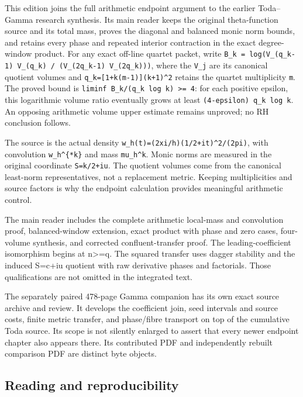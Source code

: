 \documentclass[
]{article}
\begin{document}
This edition joins the full arithmetic endpoint argument to the earlier
Toda--Gamma research synthesis. Its main reader keeps the original
theta-function source and its total mass, proves the diagonal and
balanced monic norm bounds, and retains every phase and repeated
interior contraction in the exact degree-window product. For any exact
off-line quartet packet, write
\texttt{B\_k\ =\ log(V\_(q\_k-1)\ V\_(q\_k)\ /\ (V\_(2q\_k-1)\ V\_(2q\_k)))},
where the \texttt{V\_j} are its canonical quotient volumes and
\texttt{q\_k={[}1+k(m-1){]}(k+1)\^{}2} retains the quartet multiplicity
\texttt{m}. The proved bound is
\texttt{liminf\ B\_k/(q\_k\ log\ k)\ \textgreater{}=\ 4}: for each
positive epsilon, this logarithmic volume ratio eventually grows at
least \texttt{(4-epsilon)\ q\_k\ log\ k}. An opposing arithmetic volume
upper estimate remains unproved; no RH conclusion follows.

The source is the actual density
\texttt{w\_h(t)=\textbar{}(2xi/h)(1/2+it)\textbar{}\^{}2/(2pi)}, with
convolution \texttt{w\_h\^{}\{*k\}} and mass \texttt{mu\_h\^{}k}. Monic
norms are measured in the original coordinate \texttt{S=k/2+iu}. The
quotient volumes come from the canonical least-norm representatives, not
a replacement metric. Keeping multiplicities and source factors is why
the endpoint calculation provides meaningful arithmetic control.

The main reader includes the complete arithmetic local-mass and
convolution proof, balanced-window extension, exact product with phase
and zero cases, four-volume synthesis, and corrected confluent-transfer
proof. The leading-coefficient isomorphism begins at n\textgreater=q.
The squared transfer uses dagger stability and the induced S=c+iu
quotient with raw derivative phases and factorials. Those qualifications
are not omitted in the integrated text.

The separately paired 478-page Gamma companion has its own exact source
archive and review. It develops the coefficient join, seed intervals and
source costs, finite metric transfer, and phase/fibre transport on top
of the cumulative Toda source. Its scope is not silently enlarged to
assert that every newer endpoint chapter also appears there. Its
contributed PDF and independently rebuilt comparison PDF are distinct
byte objects.

\subsection{Reading and
reproducibility}\label{reading-and-reproducibility}
\end{document}
